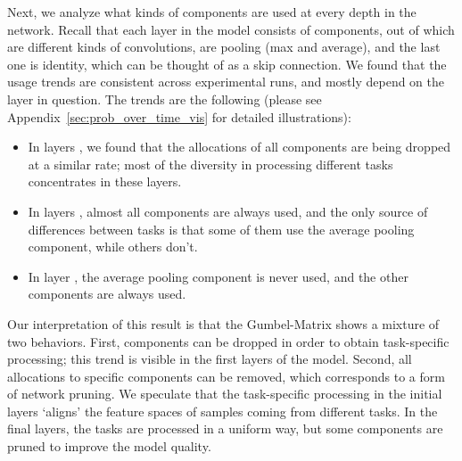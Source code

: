 \documentclass[conference]{IEEEtran}
\begin{document}
Next, we analyze what kinds of components are used at every depth in the network. Recall that each layer in the model consists of  components, out of which  are different kinds of convolutions,  are pooling (max and average), and the last one is identity, which can be thought of as a skip connection. We found that the usage trends are consistent across experimental runs, and mostly depend on the layer in question. The trends are the following (please see Appendix~\ref{sec:prob_over_time_vis} for detailed illustrations):
\begin{itemize}
    \item In layers , we found that the allocations of all components are being dropped at a similar rate; most of the diversity in processing different tasks concentrates in these layers.
    \item In layers , almost all components are always used, and the only source of differences between tasks is that some of them use the average pooling component, while others don't.
    \item In layer , the average pooling component is never used, and the other components are always used.
\end{itemize}

Our interpretation of this result is that the Gumbel-Matrix shows a mixture of two behaviors. First, components can be dropped in order to obtain task-specific processing; this trend is visible in the first layers of the model. Second, all allocations to specific components can be removed, which corresponds to a form of network pruning. We speculate that the task-specific processing in the initial layers `aligns' the feature spaces of samples coming from different tasks. In the final layers, the tasks are processed in a uniform way, but some components are pruned to improve the model quality.
\end{document}
